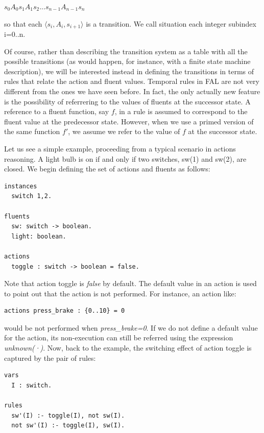 \documentclass[a4paper,12pt]{report}
\begin{document}
$
s_0  A_0  s_1  A_1  s_2  ...  s_{n-1}  A_{n-1}  s_n
$

so that each $\langle s_i,A_i,s_{i+1}\rangle$ is a transition. We call {\color{orange}situation} each integer subindex i=0..n.

Of course, rather than describing the transition system as a table with all the possible transitions (as would happen, for instance, with a finite state machine description), we will be interested instead in defining the transitions in terms of rules that relate the action and fluent values. Temporal rules in FAL are not very different from the ones we have seen before. In fact, the only actually new feature is the possibility of referrering to the values of fluents at the successor state. A reference to a fluent function, say $f$, in a rule is assumed to correspond to the fluent value at the predecessor state. However, when we use a primed version of the same function $f'$, we assume we refer to the value of $f$ at the successor state.

Let us see a simple example, proceeding from a typical scenario in actions reasoning. A light bulb is on if and only if two switches, sw(1) and sw(2), are closed. We begin defining the set of actions and fluents as follows:

\begin{verbatim}
instances
  switch 1,2.

fluents
  sw: switch -> boolean.
  light: boolean.

actions
  toggle : switch -> boolean = false.
\end{verbatim}

Note that action toggle is \textit{false} by default. The default value in an action is used to point out that the action is not performed. For instance, an action like:

\begin{verbatim}
actions press_brake : {0..10} = 0
\end{verbatim}

would be not performed when \textit{press\_brake=0}. If we do not define a default value for the action, its non-execution can still be referred using the expression \textit{unknown(·)}. Now, back to the example, the switching effect of action toggle is captured by the pair of rules:

\begin{verbatim}
vars
  I : switch.

rules
  sw'(I) :- toggle(I), not sw(I).
  not sw'(I) :- toggle(I), sw(I).
\end{verbatim}
\end{document}
